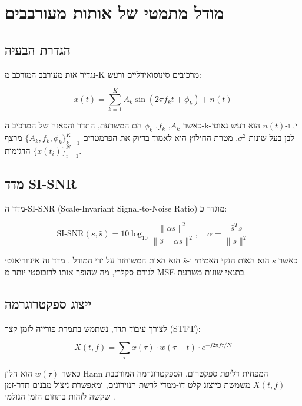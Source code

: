 
\clearpage
\chapter{מודל מתמטי של אותות מעורבבים}

\section{הגדרת הבעיה}

נגדיר אות מעורבב המורכב מ-\textenglish{K} מרכיבים סינוסואידליים ורעש:

\begin{equation}
x(t) = \sum_{k=1}^{K} A_k \sin(2\pi f_k t + \phi_k) + n(t)
\end{equation}

כאשר \(A_k\), \(f_k\), \(\phi_k\) הם המשרעת, התדר והפאזה של המרכיב ה-\textenglish{k}-י, ו-\(n(t)\) הוא רעש גאוסי לבן בעל שונות \(\sigma^2\). מטרת החילוץ היא לאמוד בדיוק את הפרמטרים \(\{A_k, f_k, \phi_k\}_{k=1}^K\) מרצף הדגימות \(\{x(t_i)\}_{i=1}^N\).

\section{מדד \textenglish{SI-SNR}}

מדד ה-\textenglish{SI-SNR} (\textenglish{Scale-Invariant Signal-to-Noise Ratio}) מוגדר כ:

\begin{equation}
\text{SI-SNR}(s, \hat{s}) = 10 \log_{10} \frac{\|\alpha s\|^2}{\|\hat{s} - \alpha s\|^2}, \quad \alpha = \frac{\hat{s}^T s}{\|s\|^2}
\end{equation}

כאשר \(s\) הוא האות הנקי האמיתי ו-\(\hat{s}\) הוא האות המשוחזר על ידי המודל \cite{tzinis2020universal}. מדד זה אינווריאנטי לגורם סקלרי, מה שהופך אותו לרובוסטי יותר מ-\textenglish{MSE} בתנאי שונות משרעת.

\section{ייצוג ספקטרוגרמה}

לצורך עיבוד תדר, נשתמש בתמרת פורייה לזמן קצר (\textenglish{STFT}):

\begin{equation}
X(t, f) = \sum_{\tau} x(\tau) \cdot w(\tau - t) \cdot e^{-j2\pi f \tau / N}
\end{equation}

כאשר \(w(\tau)\) הוא חלון \textenglish{Hann} המפחית דליפת ספקטרום. הספקטרוגרמה המורכבת \(X(t,f)\) משמשת כייצוג קלט דו-ממדי לרשת הנוירונים, ומאפשרת ניצול מבנים תדר-זמן שקשה לזהות בתחום הזמן הגולמי \cite{williamson2016complex}.
